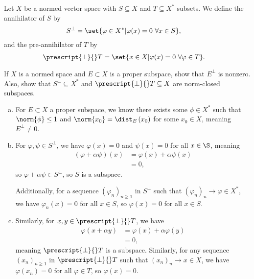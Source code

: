 \documentclass[10pt]{mypackage}
\begin{document}
  \begin{definition}
    Let $X$ be a normed vector space with $S\subseteq X$ and $T\subseteq X^{\ast}$ subsets. We define the annihilator of $S$ by
    \begin{align*}
      S^{\perp} &= \set{\varphi\in X^{\ast}| \varphi(x)= 0~\forall x\in S},
    \end{align*}
    and the pre-annihilator of $T$ by
    \begin{align*}
      \prescript{\perp}{}T &= \set{x\in X| \varphi(x) = 0~\forall \varphi \in T}.
    \end{align*}
  \end{definition}
  \begin{exercise}
    If $X$ is a normed space and $E\subset X$ is a proper subspace, show that $E^{\perp}$ is nonzero. Also, show that $S^{\perp}\subseteq X^{\ast}$ and $\prescript{\perp}{}T\subseteq X$ are norm-closed subspaces.
  \end{exercise}
  \begin{solution}\hfill
    \begin{enumerate}[(a)]
      \item For $E\subset X$ a proper subspace, we know there exists some $\phi\in X^{\ast}$ such that $\norm{\phi} \leq 1$ and $\norm{x_0} = \dist_{E}\left(x_0\right)$ for some $x_0\in X$, meaning $E^{\perp}\neq 0$.
      \item For $\varphi,\psi\in S^{\perp}$, we have $\varphi(x) = 0$ and $\psi(x) = 0$ for all $x\in \S$, meaning
        \begin{align*}
          \left(\varphi + \alpha \psi\right)\left(x\right) &= \varphi(x) + \alpha \psi(x)\\
                                                           &= 0,
        \end{align*}
        so $\varphi + \alpha \psi\in S^{\perp}$, so $S$ is a subspace.\newline

        Additionally, for a sequence $\left(\varphi_n\right)_{n\geq 1} $ in $S^{\perp}$ such that $\left(\varphi_{n}\right)_n\rightarrow \varphi\in X^{\ast}$, we have $\varphi_n(x) = 0$ for all $x\in S$, so $\varphi(x) = 0$ for all $x\in S$.
      \item Similarly, for $x,y\in \prescript{\perp}{}T$, we have
        \begin{align*}
          \varphi\left(x + \alpha y\right) &= \varphi(x) + \alpha\varphi(y)\\
                                           &= 0,
        \end{align*}
        meaning $\prescript{\perp}{}T$ is a subspace. Similarly, for any sequence $\left(x_n\right)_{n\geq 1}$ in $\prescript{\perp}{}T$ such that $\left(x_n\right)_n\rightarrow x\in X$, we have $\varphi\left(x_n\right) = 0$ for all $\varphi \in T$, so $\varphi(x) = 0$.
    \end{enumerate}
  \end{solution}
\end{document}
